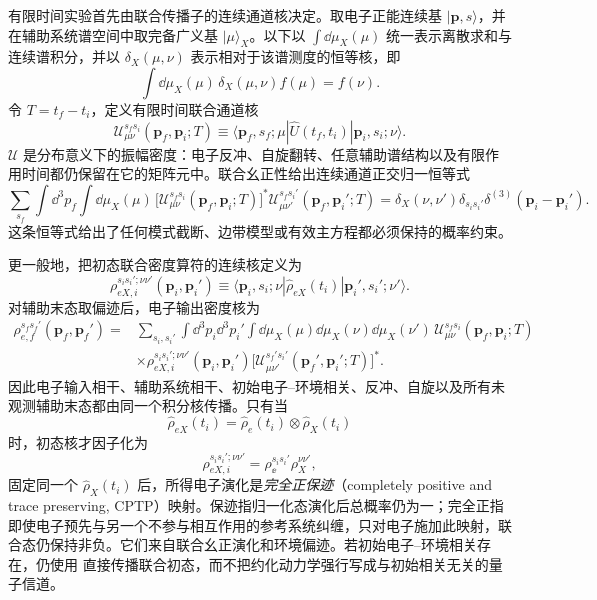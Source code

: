 有限时间实验首先由联合传播子的连续通道核决定。取电子正能连续基 $|\mathbf p,s\rangle$，并在辅助系统谱空间中取完备广义基 $|\mu\rangle_X$。以下以 $\int\dd\mu_X(\mu)$ 统一表示离散求和与连续谱积分，并以 $\delta_X(\mu,\nu)$ 表示相对于该谱测度的恒等核，即
\[
\int\dd\mu_X(\mu)\,\delta_X(\mu,\nu)f(\mu)=f(\nu).
\]
令 $T=t_f-t_i$，定义有限时间联合通道核
\begin{equation}
\boxed{
\mathscr U_{\mu\nu}^{s_f s_i}
(\mathbf p_f,\mathbf p_i;T)
\equiv
\langle \mathbf p_f,s_f;\mu|
\hat U(t_f,t_i)
|\mathbf p_i,s_i;\nu\rangle .}
\label{eq:exact_finite_time_channel_kernel}
\end{equation}
$\mathscr U$ 是分布意义下的振幅密度：电子反冲、自旋翻转、任意辅助谱结构以及有限作用时间都仍保留在它的矩阵元中。联合幺正性给出连续通道正交归一恒等式
\begin{equation}
\boxed{
\sum_{s_f}\int\dd^3p_f\int\dd\mu_X(\mu)\,
\bigl[\mathscr U_{\mu\nu}^{s_f s_i}
(\mathbf p_f,\mathbf p_i;T)\bigr]^*
\mathscr U_{\mu\nu'}^{s_f s_i'}
(\mathbf p_f,\mathbf p_i';T)
=
\delta_X(\nu,\nu')\delta_{s_i s_i'}
\delta^{(3)}(\mathbf p_i-\mathbf p_i').}
\label{eq:exact_channel_kernel_unitarity}
\end{equation}
这条恒等式给出了任何模式截断、边带模型或有效主方程都必须保持的概率约束。

更一般地，把初态联合密度算符的连续核定义为
\[
\rho_{eX,i}^{s_i s_i';\nu\nu'}(\mathbf p_i,\mathbf p_i')
\equiv
\langle\mathbf p_i,s_i;\nu|\hat\rho_{eX}(t_i)
|\mathbf p_i',s_i';\nu'\rangle .
\]
对辅助末态取偏迹后，电子输出密度核为
\begin{equation}
\boxed{
\begin{aligned}
\rho_{e,f}^{s_f s_f'}(\mathbf p_f,\mathbf p_f')
={}&\sum_{s_i,s_i'}
\int\dd^3p_i\dd^3p_i'
\int\dd\mu_X(\mu)\dd\mu_X(\nu)\dd\mu_X(\nu')\,
\mathscr U_{\mu\nu}^{s_f s_i}
(\mathbf p_f,\mathbf p_i;T)\\
&\times
\rho_{eX,i}^{s_i s_i';\nu\nu'}(\mathbf p_i,\mathbf p_i')
\bigl[\mathscr U_{\mu\nu'}^{s_f' s_i'}
(\mathbf p_f',\mathbf p_i';T)\bigr]^* .
\end{aligned}}
\label{eq:exact_reduced_electron_channel_kernel}
\end{equation}
因此电子输入相干、辅助系统相干、初始电子--环境相关、反冲、自旋以及所有未观测辅助末态都由同一个积分核传播。只有当
\[
\hat\rho_{eX}(t_i)=\hat\rho_e(t_i)\otimes\hat\rho_X(t_i)
\]
时，初态核才因子化为
\[
\rho_{eX,i}^{s_i s_i';\nu\nu'}
=\rho_\ee^{s_i s_i'}\rho_X^{\nu\nu'},
\]
固定同一个 $\hat\rho_X(t_i)$ 后，所得电子演化是\emph{完全正保迹}（completely positive and trace preserving, CPTP）映射。保迹指归一化态演化后总概率仍为一；完全正指即使电子预先与另一个不参与相互作用的参考系统纠缠，只对电子施加此映射，联合态仍保持非负。它们来自联合幺正演化和环境偏迹。若初始电子--环境相关存在，仍使用 直接传播联合初态，而不把约化动力学强行写成与初始相关无关的量子信道。

